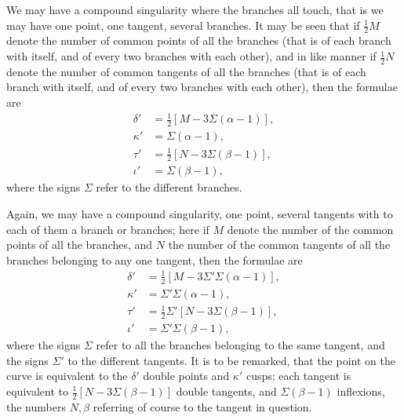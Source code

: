 \documentclass[11pt]{article}
\begin{document}
We may have a compound singularity where the branches all touch, that is we may have one point, one tangent, several branches. It may be seen that if $\tfrac{1}{2}M$ denote the number of common points of all the branches (that is of each branch with itself, and of every two branches with each other), and in like manner if $\tfrac{1}{2}N$ denote the number of common tangents of all the branches (that is of each branch with itself, and of every two branches with each other), then the formulae are
\begin{align*}
\delta' &= \tfrac{1}{2}[M - 3\Sigma(\alpha - 1)],\\
\kappa' &= \Sigma(\alpha - 1),\\
\tau' &= \tfrac{1}{2}[N - 3\Sigma(\beta - 1)],\\
\iota' &= \Sigma(\beta - 1),
\end{align*}
where the signs $\Sigma$ refer to the different branches.

Again, we may have a compound singularity, one point, several tangents with to each of them a branch or branches; here if $M$ denote the number of the common points of all the branches, and $N$ the number of the common tangents of all the branches belonging to any one tangent, then the formulae are
\begin{align*}
\delta' &= \tfrac{1}{2}[M - 3\Sigma'\Sigma(\alpha - 1)],\\
\kappa' &= \Sigma'\Sigma(\alpha - 1),\\
\tau' &= \tfrac{1}{2}\Sigma'[N - 3\Sigma(\beta - 1)],\\
\iota' &= \Sigma'\Sigma(\beta - 1),
\end{align*}
where the signs $\Sigma$ refer to all the branches belonging to the same tangent, and the signs $\Sigma'$ to the different tangents. It is to be remarked, that the point on the curve is equivalent to the $\delta'$ double points and $\kappa'$ cusps; each tangent is equivalent to $\tfrac{1}{2}[N - 3\Sigma(\beta - 1)]$ double tangents, and $\Sigma(\beta - 1)$ inflexions, the numbers $N, \beta$ referring of course to the tangent in question.
\end{document}
